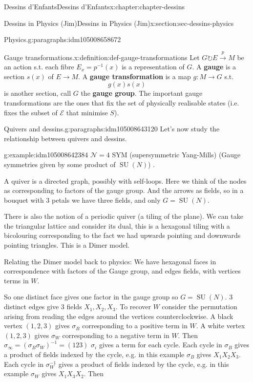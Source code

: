 \documentclass[oneside,10pt,]{book}
\newcommand{\terminology}[1]{\textbf{#1}}
\numberwithin{equation}{section}
\newcommand{\inv}{^{-1}}
\newcommand{\acts}{\circlearrowright}
\DeclareMathOperator{\specialunitary}{SU}
\begin{document}
\begin{chapterptx}{Dessins d'Enfants}{}{Dessins d'Enfants}{}{}{x:chapter:chapter-dessins}
\begin{sectionptx}{Dessins in Physics (Jim)}{}{Dessins in Physics (Jim)}{}{}{x:section:sec-dessins-physics}
\begin{paragraphs}{Physics.}{g:paragraphs:idm105008658672}
\begin{definition}{Gauge transformations.}{x:definition:def-gauge-transformations}
Let \(G \acts E \xrightarrow p M\) be an action s.t. each fibre \(E_x = p \inv(x)\) is a representation of \(G\). A \terminology{gauge} is a section \(s(x)\) of \(E \to M\). A \terminology{gauge transformation} is a map \(g\colon M \to G\) s.t.%
\begin{equation*}
g(x) s(x)
\end{equation*}
is another section, call \(G\) the \terminology{gauge group}. The important gauge transformations are the ones that fix the set of physically realisable states (i.e. fixes the subset of \(\mathcal E\) that minimise \(S\)).%
\end{definition}
\end{paragraphs}%
\begin{paragraphs}{Quivers and dessins.}{g:paragraphs:idm105008643120}%
Let's now study the relationship between quivers and dessins.%
\begin{example}{}{g:example:idm105008642384}%
\(\mathcal N = 4\) SYM (supersymmetric Yang-Mills) (Gauge symmetries given by some product of \(\specialunitary (N)\)) .%
\end{example}
A quiver is a directed graph, possibly with self-loops. Here we think of the nodes as corresponding to factors of the gauge group. And the arrows as fields, so in a bouquet with 3 petals we have three fields, and only \(G = \specialunitary (N)\).%
\par
There is also the notion of a periodic quiver (a tiling of the plane). We can take the triangular lattice and consider its dual, this is a hexagonal tiling with a bicolouring corresponding to the fact we had upwards pointing and downwards pointing triangles. This is a Dimer model.%
\par
Relating the Dimer model back to physics: We have hexagonal faces in correspondence with factors of the Gauge group, and edges fields, with vertices terms in \(W\).%
\par
So one distinct face gives one factor in the gauge group so \(G = \specialunitary (N)\). 3 distinct edges give 3 fields \(X_1, X_2, X_3\). To recover \(W\) consider the permutation arising from reading the edges around the vertices counterclockwise. A black vertex \((1,2,3)\) gives \(\sigma_B\) corresponding to a positive term in \(W\). A white vertex \((1,2,3)\) gives \(\sigma_W\) corresponding to a negative term in \(W\). Then \(\sigma_\infty = (\sigma_B\sigma_W)\inv = (123)\) \(\sigma_i\) gives a term for each cycle. Each cycle in \(\sigma_B\) gives a product of fields indexed by the cycle, e.g. in this example \(\sigma_B\) gives \(X_1X_2X_3\). Each cycle in \(\sigma_W\inv\) gives a product of fields indexed by the cycle, e.g. in this example \(\sigma_W\) gives \(X_1X_3X_2\). Then%

\end{paragraphs}
\end{sectionptx}
\end{chapterptx}
\end{document}

